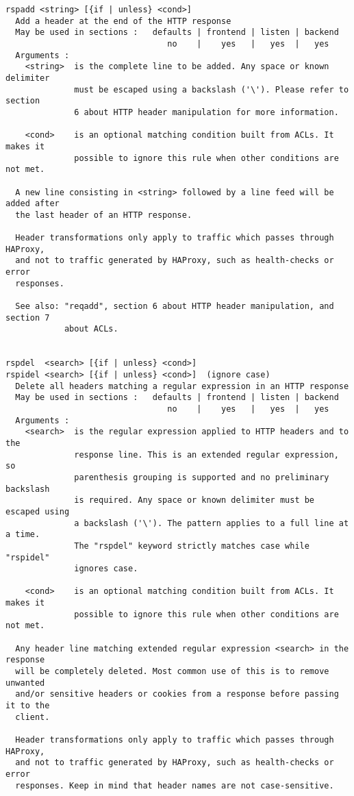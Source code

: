 \begin{verbatim}
rspadd <string> [{if | unless} <cond>]
  Add a header at the end of the HTTP response
  May be used in sections :   defaults | frontend | listen | backend
                                 no    |    yes   |   yes  |   yes
  Arguments :
    <string>  is the complete line to be added. Any space or known delimiter
              must be escaped using a backslash ('\'). Please refer to section
              6 about HTTP header manipulation for more information.

    <cond>    is an optional matching condition built from ACLs. It makes it
              possible to ignore this rule when other conditions are not met.

  A new line consisting in <string> followed by a line feed will be added after
  the last header of an HTTP response.

  Header transformations only apply to traffic which passes through HAProxy,
  and not to traffic generated by HAProxy, such as health-checks or error
  responses.

  See also: "reqadd", section 6 about HTTP header manipulation, and section 7
            about ACLs.


rspdel  <search> [{if | unless} <cond>]
rspidel <search> [{if | unless} <cond>]  (ignore case)
  Delete all headers matching a regular expression in an HTTP response
  May be used in sections :   defaults | frontend | listen | backend
                                 no    |    yes   |   yes  |   yes
  Arguments :
    <search>  is the regular expression applied to HTTP headers and to the
              response line. This is an extended regular expression, so
              parenthesis grouping is supported and no preliminary backslash
              is required. Any space or known delimiter must be escaped using
              a backslash ('\'). The pattern applies to a full line at a time.
              The "rspdel" keyword strictly matches case while "rspidel"
              ignores case.

    <cond>    is an optional matching condition built from ACLs. It makes it
              possible to ignore this rule when other conditions are not met.

  Any header line matching extended regular expression <search> in the response
  will be completely deleted. Most common use of this is to remove unwanted
  and/or sensitive headers or cookies from a response before passing it to the
  client.

  Header transformations only apply to traffic which passes through HAProxy,
  and not to traffic generated by HAProxy, such as health-checks or error
  responses. Keep in mind that header names are not case-sensitive.


\end{verbatim}
